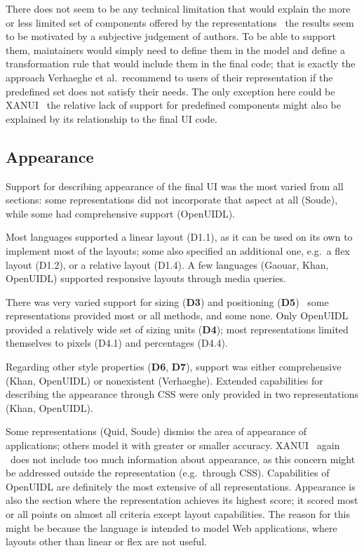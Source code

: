 There does not seem to be any technical limitation that would explain the more or less limited set of components offered by the representations \textendash\ the results seem to be motivated by a subjective judgement of authors.
To be able to support them, maintainers would simply need to define them in the model and define a transformation rule that would include them in the final code;
that is exactly the approach Verhaeghe et al.\ recommend to users of their representation if the predefined set does not satisfy their needs.
The only exception here could be XANUI \textendash\ the relative lack of support for predefined components might also be explained by its relationship to the final UI code.

\subsection{Appearance}\label{subsec:4-2-appearance}
Support for describing appearance of the final UI was the most varied from all sections: some representations did not incorporate that aspect at all (Soude), while some had comprehensive support (OpenUIDL).

Most languages supported a linear layout (D1.1), as it can be used on its own to implement most of the layouts;
some also specified an additional one, e.g.\ a flex layout (D1.2), or a relative layout (D1.4).
A few languages (Gaouar, Khan, OpenUIDL) supported responsive layouts through media queries.

There was very varied support for sizing (\textbf{D3}) and positioning (\textbf{D5}) \textendash\ some representations provided most or all methods, and some none.
Only OpenUIDL provided a relatively wide set of sizing units (\textbf{D4});
most representations limited themselves to pixels (D4.1) and percentages (D4.4).

Regarding other style properties (\textbf{D6}, \textbf{D7}), support was either comprehensive (Khan, OpenUIDL) or nonexistent (Verhaeghe).
Extended capabilities for describing the appearance through CSS were only provided in two representations (Khan, OpenUIDL).

Some representations (Quid, Soude) dismiss the area of appearance of applications;
others model it with greater or smaller accuracy.
XANUI \textendash\ again \textendash\ does not include too much information about appearance, as this concern might be addressed outside the representation (e.g.\ through CSS).
Capabilities of OpenUIDL are definitely the most extensive of all representations.
Appearance is also the section where the representation achieves its highest score;
it scored most or all points on almost all criteria except layout capabilities.
The reason for this might be because the language is intended to model Web applications, where layouts other than linear or flex are not useful.

